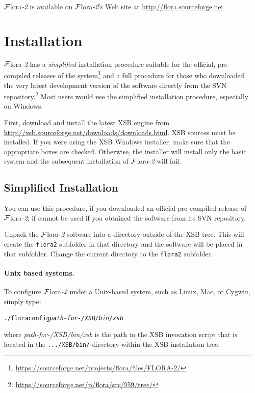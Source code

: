 \documentclass[11pt]{article}
\newcommand{\FLORA}{{\mbox{\sc ${\cal F}${lora}\rm\emph{-2}}}\xspace}
\begin{document}
\FLORA is available on \FLORA's Web site at \url{http://flora.sourceforge.net}


\section{Installation}

\FLORA has a \emph{simplified} installation procedure suitable for the
official, pre-compiled releases of the system\footnote{
  \url{https://sourceforge.net/projects/flora/files/FLORA-2/}
}
and a full procedure for those who downloaded the very latest
development version of the software directly from the SVN repository.\footnote{
  \url{https://sourceforge.net/p/flora/src/959/tree/}
}
Most users would use the simplified installation procedure, especially on
Windows.

First, download and install the latest XSB engine from
\url{http://xsb.sourceforge.net/downloads/downloads.html}.  XSB sources
must be installed. If you were using the XSB Windows installer, make sure
that the appropriate boxes are checked. Otherwise, the installer will
install only the basic system and the subsequent installation of \FLORA
will fail.


\subsection{Simplified Installation}

You can use this procedure, if you downloaded an official pre-compiled
release of \FLORA; if cannot be used if you obtained the software from its
SVN repository.

Unpack the \FLORA software into a directory outside of the XSB tree.
This will create the \texttt{flora2} subfolder in that directory
and the software will be placed in that subfolder.
Change the current directory to the \texttt{flora2} subfolder.

\paragraph{Unix based systems.}
To configure \FLORA under a Unix-based system, such as Linux, Mac, or
Cygwin, simply type:
\begin{alltt}
   ./floraconfig  \textnormal{\emph{path-for-/XSB/bin/xsb}}
\end{alltt}
where \emph{path-for-/XSB/bin/xsb}  is the path to the XSB invocation
script that is located in the \texttt{.../XSB/bin/} directory within the
XSB installation tree.
\end{document}
